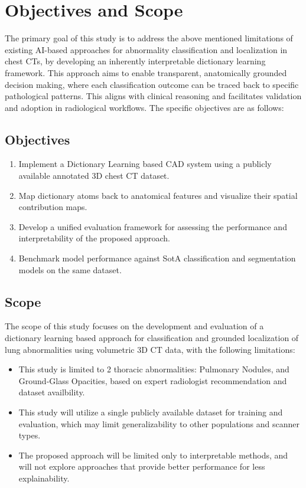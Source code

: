 \section{Objectives and Scope}
The primary goal of this study is to address the above mentioned limitations of existing AI-based approaches for abnormality
classification and localization in chest CTs, by developing an inherently interpretable dictionary learning framework.
This approach aims to enable transparent, anatomically grounded decision making, where each classification outcome
can be traced back to specific pathological patterns. This aligns with clinical reasoning and facilitates validation and
adoption in radiological workflows. The specific objectives are as follows:

\subsection{Objectives}
\begin{enumerate}
	\item Implement a Dictionary Learning based CAD system using a publicly available annotated 3D chest CT dataset.
	\item Map dictionary atoms back to anatomical features and visualize their spatial contribution maps.
	\item Develop a unified evaluation framework for assessing the performance and interpretability of the proposed approach.
	\item Benchmark model performance against SotA classification and segmentation models on the same dataset.
\end{enumerate}

\subsection{Scope}
The scope of this study focuses on the development and evaluation of a dictionary learning based approach for classification
and grounded localization of lung abnormalities using volumetric 3D CT data, with the following limitations:

\begin{itemize}
	\item This study is limited to 2 thoracic abnormalities: Pulmonary Nodules, and Ground-Glass Opacities, based on expert radiologist recommendation and dataset availbility.
	\item This study will utilize a single publicly available dataset for training and evaluation, which may limit generalizability to other populations and scanner types.
	\item The proposed approach will be limited only to interpretable methods, and will not explore approaches that provide better performance for less explainability.
\end{itemize}


